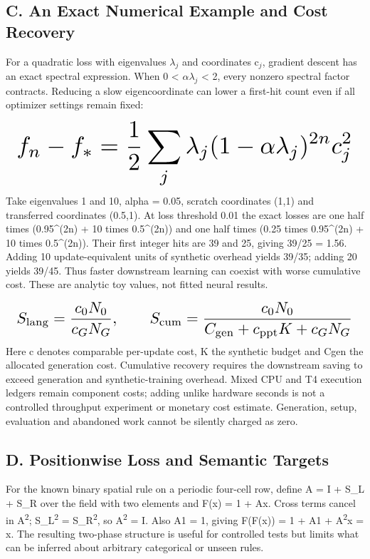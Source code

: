 \documentclass[10pt,letterpaper,twocolumn]{article}
\begin{document}
\subsection*{C. An Exact Numerical Example and Cost Recovery}
For a quadratic loss with eigenvalues \ensuremath{\lambda}\ensuremath{_j} and coordinates c\ensuremath{_j}, gradient descent has an exact spectral expression. When 0 < \ensuremath{\alpha}\ensuremath{\lambda}\ensuremath{_j} < 2, every nonzero spectral factor contracts. Reducing a slow eigencoordinate can lower a first-hit count even if all optimizer settings remain fixed:

\begin{equation}
\resizebox{.98\columnwidth}{!}{$\displaystyle f_n-f_*={1\over2}\sum_j\lambda_j(1-\alpha\lambda_j)^{2n}c_j^2$}
\end{equation}
Take eigenvalues 1 and 10, alpha = 0.05, scratch coordinates (1,1) and transferred coordinates (0.5,1). At loss threshold 0.01 the exact losses are one half times (0.95\textasciicircum{}(2n) + 10 times 0.5\textasciicircum{}(2n)) and one half times (0.25 times 0.95\textasciicircum{}(2n) + 10 times 0.5\textasciicircum{}(2n)). Their first integer hits are 39 and 25, giving 39/\allowbreak{}25 = 1.56. Adding 10 update-equivalent units of synthetic overhead yields 39/\allowbreak{}35; adding 20 yields 39/\allowbreak{}45. Thus faster downstream learning can coexist with worse cumulative cost. These are analytic toy values, not fitted neural results.

\begin{equation}
\resizebox{.98\columnwidth}{!}{$\displaystyle S_{\rm lang}={c_0N_0\over c_GN_G},\qquad S_{\rm cum}={c_0N_0\over C_{\rm gen}+c_{\rm ppt}K+c_GN_G}$}
\end{equation}
Here c denotes comparable per-update cost, K the synthetic budget and Cgen the allocated generation cost. Cumulative recovery requires the downstream saving to exceed generation and synthetic-training overhead. Mixed CPU and T4 execution ledgers remain component costs; adding unlike hardware seconds is not a controlled throughput experiment or monetary cost estimate. Generation, setup, evaluation and abandoned work cannot be silently charged as zero.

\subsection*{D. Positionwise Loss and Semantic Targets}
For the known binary spatial rule on a periodic four-cell row, define A = I + S\_\allowbreak{}L + S\_\allowbreak{}R over the field with two elements and F(x) = 1 + Ax. Cross terms cancel in A\textsuperscript{2}; S\_\allowbreak{}L\textsuperscript{2} = S\_\allowbreak{}R\textsuperscript{2}, so A\textsuperscript{2} = I. Also A1 = 1, giving F(F(x)) = 1 + A1 + A\textsuperscript{2}x = x. The resulting two-phase structure is useful for controlled tests but limits what can be inferred about arbitrary categorical or unseen rules.
\end{document}
